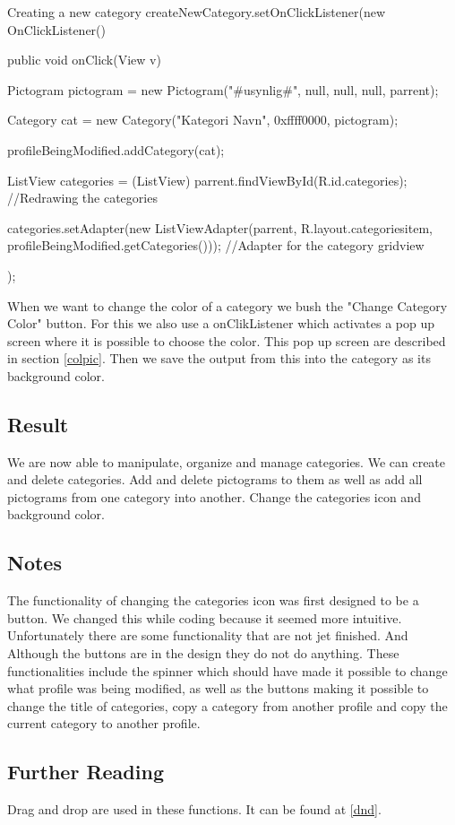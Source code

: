 \begin{source}[{mc6}]{Creating a new category}
createNewCategory.setOnClickListener(new OnClickListener() 
		{
			public void onClick(View v) 
			{
				Pictogram pictogram = new Pictogram("#usynlig#", null, null, null, parrent);
				
				Category cat = new Category("Kategori Navn", 0xffff0000, pictogram);
				
				profileBeingModified.addCategory(cat);
				
				ListView categories = (ListView) parrent.findViewById(R.id.categories); //Redrawing the categories
				
				categories.setAdapter(new ListViewAdapter(parrent, R.layout.categoriesitem, profileBeingModified.getCategories())); 
				//Adapter for the category gridview
			}
		});
\end{source}
When we want to change the color of a category we bush the "Change Category Color" button. 
For this we also use a onClikListener which activates a pop up screen where it is possible to choose the color. This pop up screen are described in section \autoref{colpic}.
Then we save the output from this into the category as its background color. 

\subsection*{Result}
We are now able to manipulate, organize and manage categories. We can create and delete categories. 
Add and delete pictograms to them as well as add all pictograms from one category into another. 
Change the categories icon and background color.


\subsection*{Notes}
The functionality of changing the categories icon was first designed to be a button. We changed this while coding because it seemed more intuitive. 
Unfortunately there are some functionality that are not jet finished. And Although the buttons are in the design they do not do anything. 
These functionalities include the spinner which should have made it possible to change what profile was being modified, as well as the buttons making it possible to change the title of categories, copy a category from another profile and copy the current category to another profile. 


\subsection*{Further Reading}
Drag and drop are used in these functions. It can be found at \autoref{dnd}.